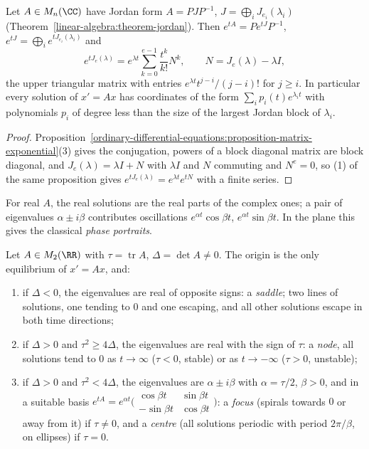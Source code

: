 \begin{proposition}[Computing $e^{tA}$]\label{ordinary-differential-equations:proposition-computing-exponential}
Let $A \in M_n(\CC)$ have Jordan form $A = PJP^{-1}$, $J = \bigoplus_iJ_{e_i}(\lambda_i)$ (Theorem~\ref{linear-algebra:theorem-jordan}). Then $e^{tA} = Pe^{tJ}P^{-1}$, $e^{tJ} = \bigoplus_ie^{tJ_{e_i}(\lambda_i)}$ and
\[
e^{tJ_e(\lambda)} = e^{\lambda t}\sum_{k=0}^{e-1}\frac{t^k}{k!}N^k, \qquad N = J_e(\lambda) - \lambda I,
\]
the upper triangular matrix with entries $e^{\lambda t}t^{j-i}/(j - i)!$ for $j \geq i$. In particular every solution of $x' = Ax$ has coordinates of the form $\sum_ip_i(t)e^{\lambda_it}$ with polynomials $p_i$ of degree less than the size of
the largest Jordan block of $\lambda_i$.
\end{proposition}

\begin{proof}
Proposition~\ref{ordinary-differential-equations:proposition-matrix-exponential}(3) gives the conjugation, powers of a block diagonal matrix are block diagonal, and $J_e(\lambda) = \lambda I + N$ with $\lambda I$ and $N$ commuting and
$N^e = 0$, so (1) of the same proposition gives $e^{tJ_e(\lambda)} = e^{\lambda t}e^{tN}$ with a finite series.
\end{proof}

For real $A$, the real solutions are the real parts of the complex ones; a pair of eigenvalues $\alpha \pm i\beta$ contributes oscillations $e^{\alpha t}\cos\beta t$, $e^{\alpha t}\sin\beta t$. In the plane this gives the classical
\emph{phase portraits}.

\begin{proposition}\label{ordinary-differential-equations:proposition-planar}
Let $A \in M_2(\RR)$ with $\tau = \operatorname{tr}A$, $\Delta = \det A \neq 0$. The origin is the only equilibrium of $x' = Ax$, and:
\begin{enumerate}
\item if $\Delta < 0$, the eigenvalues are real of opposite signs: a \emph{saddle}; two lines of solutions, one tending to $0$ and one escaping, and all other solutions escape in both time directions;
\item if $\Delta > 0$ and $\tau^2 \geq 4\Delta$, the eigenvalues are real with the sign of $\tau$: a \emph{node}, all solutions tend to $0$ as $t \to \infty$ ($\tau < 0$, stable) or as $t \to -\infty$ ($\tau > 0$, unstable);
\item if $\Delta > 0$ and $\tau^2 < 4\Delta$, the eigenvalues are $\alpha \pm i\beta$ with $\alpha = \tau/2$, $\beta > 0$, and in a suitable basis $e^{tA} = e^{\alpha t}\bigl(\begin{smallmatrix}\cos\beta t & \sin\beta t\\ -\sin\beta t & \cos\beta t\end{smallmatrix}\bigr)$:
a \emph{focus} (spirals towards $0$ or away from it) if $\tau \neq 0$, and a \emph{centre} (all solutions periodic with period $2\pi/\beta$, on ellipses) if $\tau = 0$.
\end{enumerate}
\end{proposition}

